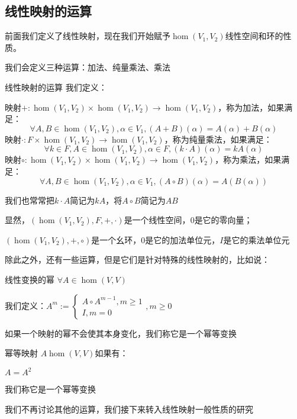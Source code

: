 \documentclass[12pt, a4paper, oneside, UTF8]{ctexbook}
\begin{document}
		\subsection{线性映射的运算}
			前面我们定义了线性映射，现在我们开始赋予$\hom (V_1,V_2)$线性空间和环的性质。

			我们会定义三种运算：加法、纯量乘法、乘法
			\begin{defn}{线性映射的运算}{}
				我们定义：
				
				映射$+:\hom(V_1,V_2) \times \hom(V_1,V_2) \rightarrow \hom(V_1,V_2)$，称为加法，如果满足：
				\begin{equation}
					\forall A,B \in \hom(V_1,V_2),\alpha \in V_1,(A+B)(\alpha )=A(\alpha )+B(\alpha )
				\end{equation}
				映射$\cdot:F \times \hom(V_1,V_2) \rightarrow \hom(V_1,V_2)$，称为纯量乘法，如果满足：
				\begin{equation}
					\forall k \in F,A \in \hom(V_1,V_2),\alpha \in F,(k\cdot A)(\alpha )=kA(\alpha )
				\end{equation}
				映射$\circ:\hom(V_1,V_2) \times \hom(V_1,V_2) \rightarrow \hom(V_1,V_2)$，称为乘法，如果满足：
				\begin{equation}
					\forall A,B \in \hom(V_1,V_2),\alpha \in V_1,(A\circ B)(\alpha )=A\left(B(\alpha )\right)
				\end{equation}
			\end{defn}
			我们也常常把$k\cdot A$简记为$kA$，将$A \circ B$简记为$AB$

			显然，$\left(\hom(V_1,V_2),F,+,\cdot\right)$是一个线性空间，$0$是它的零向量；

			$\left(\hom(V_1,V_2),+,\circ\right)$是一个幺环，$0$是它的加法单位元，$I$是它的乘法单位元

			除此之外，还有一些运算，但是它们是针对特殊的线性映射的，比如说：
			\begin{defn}{线性变换的幂}{}
				$\forall A \in \hom(V,V)$

				我们定义：$A^m:= \begin{cases}
					A\circ A^{m-1},m \geqslant 1 \\
					I,m = 0
				\end{cases},m \geqslant 0$
			\end{defn}
			如果一个映射的幂不会使其本身变化，我们称它是一个幂等变换
			\begin{defn}{幂等映射}{}
				$A \hom(V,V)$如果有：

				$A = A^2$

				我们称它是一个幂等变换
			\end{defn}
			我们不再讨论其他的运算，我们接下来转入线性映射一般性质的研究
\end{document}
